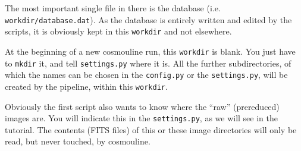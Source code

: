 \begin{itemize}
The most important single file in there is the database (i.e. \verb+workdir/database.dat+). As the database is entirely written and edited by the scripts, it is obviously kept in this \verb+workdir+ and not elsewhere.

At the beginning of a new cosmouline run, this \verb+workdir+ is blank. You just have to \verb+mkdir+ it, and tell \verb+settings.py+ where it is.
All the further subdirectories, of which the names can be chosen in the \verb+config.py+ or the \verb+settings.py+, will be created by the pipeline, within this \verb+workdir+.

\end{itemize}



Obviously the first script also wants to know where the ``raw'' (prereduced) images are. You will indicate this in the \verb+settings.py+, as we will see in the tutorial. The contents (FITS files) of this or these image directories will only be read, but never touched, by cosmouline.



